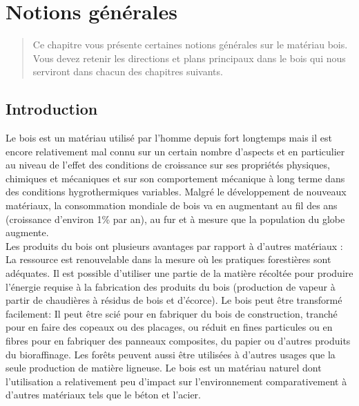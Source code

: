\chapter{Notions générales}

\begin{abstract}
Ce chapitre vous présente certaines notions générales sur le matériau bois. Vous devez retenir les directions et plans principaux dans le bois qui nous serviront dans chacun des chapitres suivants.
\end{abstract}

\minitoc

\section{Introduction}

Le bois est un matériau utilisé par l'homme depuis fort longtemps mais il est encore relativement mal connu sur un certain nombre d'aspects et en particulier au niveau de l'effet des conditions de croissance sur ses propriétés physiques, chimiques et mécaniques et sur son comportement mécanique à long terme dans des conditions hygrothermiques variables. Malgré le développement de nouveaux matériaux, la consommation mondiale de bois va en augmentant au fil des ans (croissance d'environ 1\% par an), au fur et à mesure que la population du globe augmente.\\

Les produits du bois ont plusieurs avantages par rapport à d'autres matériaux \cite{bowyer2007forest}: La ressource est renouvelable dans la mesure où les pratiques forestières sont adéquates. Il est possible d'utiliser une partie de la matière récoltée pour produire l'énergie requise à la fabrication des produits du bois (production de vapeur à partir de chaudières à résidus de bois et d'écorce). Le bois peut être transformé facilement: Il peut être scié pour en fabriquer du bois de construction, tranché pour en faire des copeaux ou des placages, ou réduit en fines particules ou en fibres pour en fabriquer des panneaux composites, du papier ou d'autres produits du bioraffinage. Les forêts peuvent aussi être utilisées à d'autres usages que la seule production de matière ligneuse. Le bois est un matériau naturel dont l'utilisation a relativement peu d'impact sur l'environnement comparativement à d'autres matériaux tels que le béton et l'acier.\\

